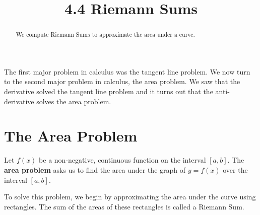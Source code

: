 \documentclass[handout]{ximera}
\title{4.4 Riemann Sums}
\begin{document}
\begin{abstract}
We compute Riemann Sums to approximate the area under a curve.
\end{abstract}

\maketitle

The first major problem in calculus was the tangent line problem. We now turn to the second major problem in calculus, the area problem.
We saw that the derivative solved the tangent line problem and it turns out that the anti-derivative solves the area problem.
\section{The Area Problem}


Let $f(x)$ be a non-negative, continuous function on the interval $[a,b]$. The \textbf{area problem} asks us to find the area under the graph of $y = f(x)$
over the interval $[a,b]$.

\begin{image}
\end{image}

To solve this problem, we begin by approximating the area under the curve using rectangles. The sum of the areas of these rectangles is called a Riemann Sum.
\end{document}
